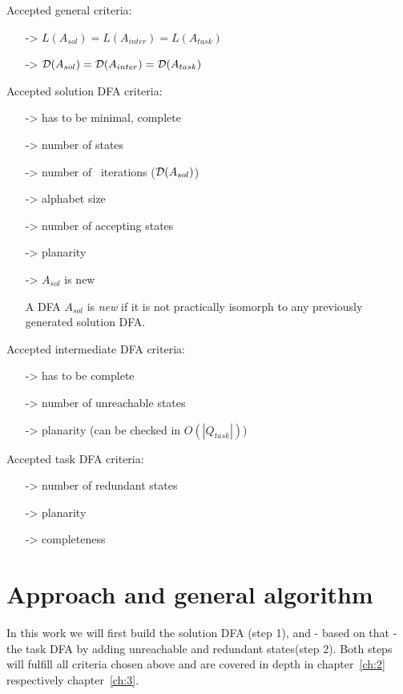 \label{ch:1:determined-requirements}
Accepted general criteria:
\begin{itemize}
	\item[->] $L(A_{sol}) = L(A_{inter}) = L(A_{task})$
	\item[->] $\mathcal{D}(A_{sol}) = \mathcal{D}(A_{inter}) = \mathcal{D}(A_{task})$
\end{itemize}
Accepted solution DFA criteria:
\begin{itemize}
	\item[->] has to be minimal, complete
	\item[->] number of states
	\item[->] number of \CompDist\ iterations ($\mathcal{D}(A_{sol})$)
	\item[->] alphabet size
	\item[->] number of accepting states
	\item[->] planarity
	\item[->] $A_{sol}$ is new
	
	\begin{definition} \label{ch:1:new-dfa}
		A DFA $A_{sol}$ is \emph{new} if it is not practically isomorph to any previously generated solution DFA.
	\end{definition}
\end{itemize}
Accepted intermediate DFA criteria:
\begin{itemize}
	\item[->] has to be complete
	\item[->] number of unreachable states
	\item[->] planarity (can be checked in $O(|Q_{task}|)$)
\end{itemize}
Accepted task DFA criteria:
\begin{itemize}
	\item[->] number of redundant states
	\item[->] planarity
	\item[->] completeness
\end{itemize}

\section{Approach and general algorithm}

In this work we will first build the solution DFA (step 1), and - based on that - the task DFA by adding unreachable and redundant states(step 2). Both steps will fulfill all criteria chosen above and are covered in depth in chapter~\ref{ch:2} respectively chapter~\ref{ch:3}.

